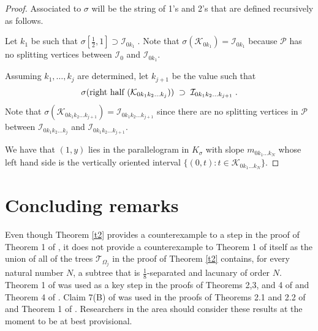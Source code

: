 \documentclass[12pt]{amsart}
\numberwithin{equation}{section}
\theoremstyle{definition}
\theoremstyle{remark}
\begin{document}
\begin{proof}
   Associated to $\sigma$ will be the string of 1's and 2's that are defined recursively as follows.
   
   Let $k_1$ be such that $\sigma[\frac{1}{2}, 1] \supset \mathcal{I}_{0 k_1}\;.$ Note that $\sigma(\mathcal{K}_{0k_1}) = \mathcal{I}_{0k_1}$ because $  {\mathscr{P}}$ has no splitting vertices between $\mathcal{I}_0$ and $\mathcal{I}_{0 k_1}$.
   
   Assuming $k_1, \ldots, k_j$ are determined, let $k_{j+1}$ be the value such that
    $$\sigma(\textup{right half }(\mathcal{K}_{0k_1k_2\ldots k_j})) \;\supset\; \mathcal{I}_{0k_1k_2\ldots k_{j+1}}\;.$$
    Note that $\sigma(\mathcal{K}_{0k_1k_2\ldots k_{j+1}}) = \mathcal{I}_ {0k_1k_2\ldots k_{j+1}}$ since there are no splitting vertices in $ {\mathscr{P}}$ between $
 \mathcal{I}_ {0k_1k_2\ldots k_{j}}$ and $\mathcal{I}_ {0k_1k_2\ldots k_{j+1}}$.
 
We have that $(1,y)$ lies in the parallelogram in $K_\sigma$ with slope $m_{0k_1\ldots k_N}$ whose left hand side is the vertically oriented interval $\{(0,t) : t \in \mathcal{K}_{0k_1\ldots k_N}\}$.
\end{proof}
   

\section{Concluding remarks}\label{s5}
Even though Theorem \ref{t2} provides a counterexample to a step in the proof of Theorem 1 of \cite{Ba}, it does not provide a counterexample to Theorem 1 of \cite{Ba} itself as the union of all of the trees $\mathscr{T}_{\Omega_j}$ in the proof of Theorem \ref{t2} contains, for every natural number $N$, a subtree that is $\frac{1}{8}$-separated and lacunary of order $N$.
\\


Theorem 1 of \cite{Ba} was used as a key step in the proofs of Theorems 2,3, and 4 of \cite{h2013} and Theorem 4 of \cite{hs2}.   Claim 7(B) of \cite{Ba} was used in the proofs of Theorems 2.1 and 2.2 of \cite{gauvannyj2024} and Theorem 1 of \cite{hs2022}\;.  Researchers in the area should consider these results at the moment to be at best provisional.
\\

\end{document}
